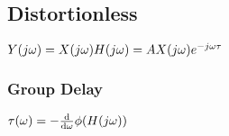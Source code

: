 \subsection*{Distortionless}

$Y(j\omega) = X(j\omega) H(j\omega) = AX(j\omega) e^{-j\omega \tau}$
\subsubsection*{Group Delay}

$\tau(\omega)=-\frac{\mathrm{d}}{\mathrm{d}\omega} \phi(H(j\omega))$